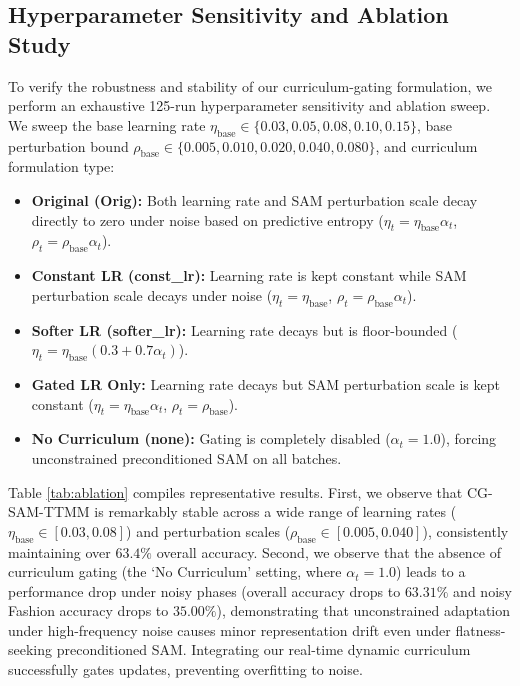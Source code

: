 \documentclass{article}
\theoremstyle{plain}
\theoremstyle{definition}
\theoremstyle{remark}
\begin{document}
\subsection{Hyperparameter Sensitivity and Ablation Study}
To verify the robustness and stability of our curriculum-gating formulation, we perform an exhaustive 125-run hyperparameter sensitivity and ablation sweep. We sweep the base learning rate $\eta_{\text{base}} \in \{0.03, 0.05, 0.08, 0.10, 0.15\}$, base perturbation bound $\rho_{\text{base}} \in \{0.005, 0.010, 0.020, 0.040, 0.080\}$, and curriculum formulation type:
\begin{itemize}
    \item \textbf{Original (Orig):} Both learning rate and SAM perturbation scale decay directly to zero under noise based on predictive entropy ($\eta_t = \eta_{\text{base}} \alpha_t$, $\rho_t = \rho_{\text{base}} \alpha_t$).
    \item \textbf{Constant LR (const\_lr):} Learning rate is kept constant while SAM perturbation scale decays under noise ($\eta_t = \eta_{\text{base}}$, $\rho_t = \rho_{\text{base}} \alpha_t$).
    \item \textbf{Softer LR (softer\_lr):} Learning rate decays but is floor-bounded ($\eta_t = \eta_{\text{base}} (0.3 + 0.7\alpha_t)$).
    \item \textbf{Gated LR Only:} Learning rate decays but SAM perturbation scale is kept constant ($\eta_t = \eta_{\text{base}} \alpha_t$, $\rho_t = \rho_{\text{base}}$).
    \item \textbf{No Curriculum (none):} Gating is completely disabled ($\alpha_t = 1.0$), forcing unconstrained preconditioned SAM on all batches.
\end{itemize}

Table \ref{tab:ablation} compiles representative results.
First, we observe that CG-SAM-TTMM is remarkably stable across a wide range of learning rates ($\eta_{\text{base}} \in [0.03, 0.08]$) and perturbation scales ($\rho_{\text{base}} \in [0.005, 0.040]$), consistently maintaining over $63.4\%$ overall accuracy.
Second, we observe that the absence of curriculum gating (the `No Curriculum' setting, where $\alpha_t = 1.0$) leads to a performance drop under noisy phases (overall accuracy drops to $63.31\%$ and noisy Fashion accuracy drops to $35.00\%$), demonstrating that unconstrained adaptation under high-frequency noise causes minor representation drift even under flatness-seeking preconditioned SAM. Integrating our real-time dynamic curriculum successfully gates updates, preventing overfitting to noise.
\end{document}

